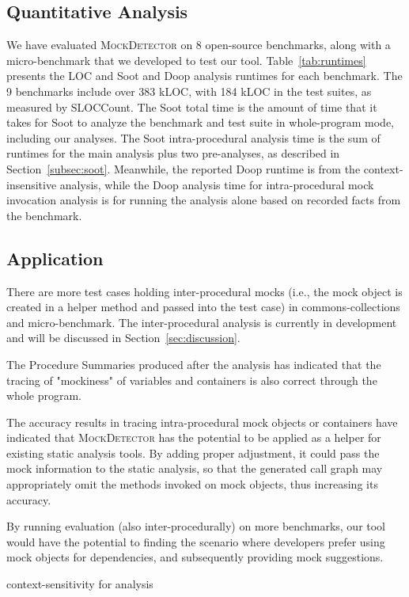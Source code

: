 \subsection{Quantitative Analysis}
\label{subsec:effectiveness}

We have evaluated \textsc{MockDetector} on 8 open-source benchmarks, along with a micro-benchmark that we developed to test our tool. Table~\ref{tab:runtimes} presents the LOC and Soot and Doop analysis runtimes for each benchmark. The 9 benchmarks include over 383 kLOC, with 184 kLOC in the test suites, as measured by SLOCCount. The Soot total time is the amount of time that it takes for Soot to analyze the benchmark and test suite in whole-program mode, including our analyses. The Soot intra-procedural analysis time is the sum of runtimes for the main analysis plus two pre-analyses, as described in Section~\ref{subsec:soot}. Meanwhile, the reported Doop runtime is from the context-insensitive analysis, while the Doop analysis time for intra-procedural mock invocation analysis is for running the analysis alone based on recorded facts from the benchmark.

\subsection{Application}
\label{subsec:static}

There are more test cases holding inter-procedural mocks (i.e., the mock object is created in a helper method and passed into the test case) in commons-collections and micro-benchmark. The inter-procedural analysis is currently in development and will be discussed in Section~\ref{sec:discussion}.

The Procedure Summaries produced after the analysis has indicated that the tracing of "mockiness" of variables and containers is also correct through the whole program. 

The accuracy results in tracing intra-procedural mock objects or containers have indicated that \textsc{MockDetector} has the potential to be applied as a helper for existing static analysis tools. By adding proper adjustment, it could pass the mock information to the static analysis, so that the generated call graph may appropriately omit the methods invoked on mock objects, thus increasing its accuracy.

By running evaluation (also inter-procedurally) on more benchmarks, our tool would have the potential to finding the scenario where developers prefer using mock objects for dependencies, and subsequently providing mock suggestions.


context-sensitivity for analysis
